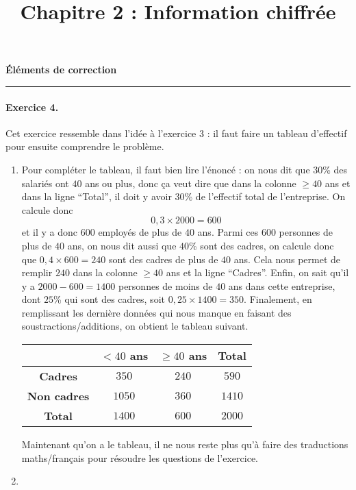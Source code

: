 \documentclass[11pt]{article}
\title{Chapitre 2 : Information chiffrée}
\date{}
\author{}
\begin{document}

\begin{center}
  \LARGE \textbf{Éléments de correction}\\[-5mm]
\rule{10cm}{1pt}
\end{center}
\paragraph{Exercice 4.} Cet exercice ressemble dans l'idée à l'exercice 3 : il
faut faire un tableau d'effectif pour ensuite comprendre le problème.
\begin{enumerate}
  \item Pour compléter le tableau, il faut bien lire l'énoncé : on nous dit que
    $30$\% des salariés ont $40$ ans ou plus, donc ça veut dire que dans la
    colonne $\geq 40$ ans et dans la ligne ``Total'', il doit y avoir $30$\% de
    l'effectif total de l'entreprise. On calcule donc
    \[
      0,3 \times 2000 = 600
    \]
    et il y a donc $600$ employés de plus de $40$ ans. Parmi ces $600$
    personnes de plus de $40$ ans, on nous dit aussi que $40$\% sont des cadres,
    on calcule donc que $0,4\times600=240$ sont des cadres de plus de $40$ ans.
    Cela nous permet de remplir $240$ dans la colonne $\geq40$ ans et la ligne
    ``Cadres''. Enfin, on sait qu'il y a $2000-600=1400$ personnes de moins de
    $40$ ans dans cette entreprise, dont $25$\% qui sont des cadres, soit
    $0,25\times1400=350$. Finalement, en remplissant les dernière données qui
    nous manque en faisant des soustractions/additions, on obtient le tableau
    suivant.
  \begin{center}
 \begin{tabular}{cccc}
  \toprule
  & \textbf{$<40$ ans} & \textbf{$\geq40$ ans} & \textbf{Total} \\
  \midrule
  \textbf{Cadres} & $350$ &  $240$ & $590$ \\
  \textbf{Non cadres} & $1050$  & $360$ & $1410$ \\
  \textbf{Total} & $1400$  & $600$ & $2000$ \\
  \bottomrule
\end{tabular}
  \end{center}
  Maintenant qu'on a le tableau, il ne nous reste plus qu'à faire des
  traductions maths/français pour résoudre les questions de l'exercice.
\item \begin{enumerate}

\end{enumerate}
\end{enumerate}
\end{document}
